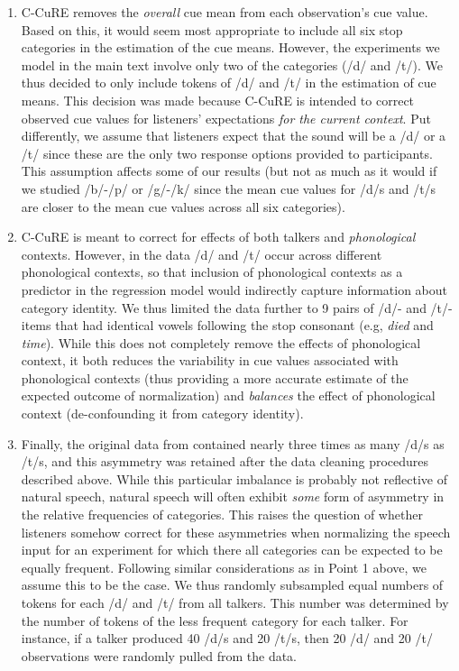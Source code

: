 \documentclass[
  11pt,
  man,floatsintext]{apa6}
\begin{document}
\begin{enumerate}
\def\labelenumi{\arabic{enumi}.}
\item
  C-CuRE removes the \emph{overall} cue mean from each observation's cue value. Based on this, it would seem most appropriate to include all six stop categories in the estimation of the cue means. However, the experiments we model in the main text involve only two of the categories (/d/ and /t/). We thus decided to only include tokens of /d/ and /t/ in the estimation of cue means. This decision was made because C-CuRE is intended to correct observed cue values for listeners' expectations \emph{for the current context}. Put differently, we assume that listeners expect that the sound will be a /d/ or a /t/ since these are the only two response options provided to participants. This assumption affects some of our results (but not as much as it would if we studied /b/-/p/ or /g/-/k/ since the mean cue values for /d/s and /t/s are closer to the mean cue values across all six categories).
\item
  C-CuRE is meant to correct for effects of both talkers and \emph{phonological} contexts. However, in the \textcite{chodroff-wilson2018} data /d/ and /t/ occur across different phonological contexts, so that inclusion of phonological contexts as a predictor in the regression model would indirectly capture information about category identity. We thus limited the data further to 9 pairs of /d/- and /t/-items that had identical vowels following the stop consonant (e.g, \emph{\emph{d}ied} and \emph{\emph{t}ime}). While this does not completely remove the effects of phonological context, it both reduces the variability in cue values associated with phonological contexts (thus providing a more accurate estimate of the expected outcome of normalization) and \emph{balances} the effect of phonological context (de-confounding it from category identity).
\item
  Finally, the original data from \textcite{chodroff-wilson2018} contained nearly three times as many /d/s as /t/s, and this asymmetry was retained after the data cleaning procedures described above. While this particular imbalance is probably not reflective of natural speech, natural speech will often exhibit \emph{some} form of asymmetry in the relative frequencies of categories. This raises the question of whether listeners somehow correct for these asymmetries when normalizing the speech input for an experiment for which there all categories can be expected to be equally frequent. Following similar considerations as in Point 1 above, we assume this to be the case. We thus randomly subsampled equal numbers of tokens for each /d/ and /t/ from all talkers. This number was determined by the number of tokens of the less frequent category for each talker. For instance, if a talker produced 40 /d/s and 20 /t/s, then 20 /d/ and 20 /t/ observations were randomly pulled from the data.
\end{enumerate}
\end{document}
